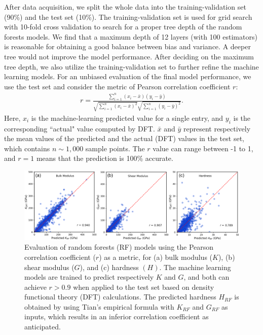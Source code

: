 	After data acquisition, we split the whole data into the training-validation set (90\%) and the test set (10\%). The training-validation set is used for grid search with 10-fold cross validation to search for a proper tree depth of the random forests models. We find that a maximum depth of 12 layers (with 100 estimators) is reasonable for obtaining a good balance between bias and variance.
	A deeper tree would not improve the model performance.
	After deciding on the maximum tree depth, we also utilize the training-validation set to further refine the machine learning models. 
	For an unbiased evaluation of the final model performance, we use the test set and consider the metric of Pearson correlation coefficient $r$:
	\begin{equation}
		\label{eq:3}
		\begin{aligned}
			r =
			\frac{ \sum_{i=1}^{n}(x_i-\bar{x})(y_i-\bar{y}) }{
				\sqrt{\sum_{i=1}^{n}(x_i-\bar{x})^2}\sqrt{\sum_{i=1}^{n}(y_i-\bar{y})^2}}.
		\end{aligned}
	\end{equation}
	Here, $x_i$ is the machine-learning predicted value for a single entry, and $y_i$ is the corresponding ``actual" value computed by DFT. $\bar{x}$ and $\bar{y}$ represent respectively the mean values of the predicted and the actual (DFT) values in the test set, which contains $n \sim 1,000$ sample points. The $r$ value can range between -1 to 1, and $r=1$ means that the prediction is 100\% accurate.
	\begin{figure}[htbp]
        \centering
        \captionsetup{singlelinecheck = false, justification=justified}
        \includegraphics[width=1.0\textwidth]{BCN_3_model.png}
        \caption[Evaluation of random forests models in B-C-N study]{Evaluation of random forests (RF) models using the Pearson correlation coefficient ($r$) as a metric, for (a) bulk modulus ($K$), (b) shear modulus ($G$), and (c) hardness $(H)$. The machine learning models are trained to predict respectively $K$ and $G$, and both can achieve $r > 0.9$ when applied to the test set based on density functional theory (DFT) calculations. The predicted hardness $H_{RF}$ is obtained by using Tian's empirical formula with $K_{RF}$ and $G_{RF}$ as inputs, which results in an inferior correlation coefficient as anticipated.}
        \label{BCN_3_model}
    \end{figure}
